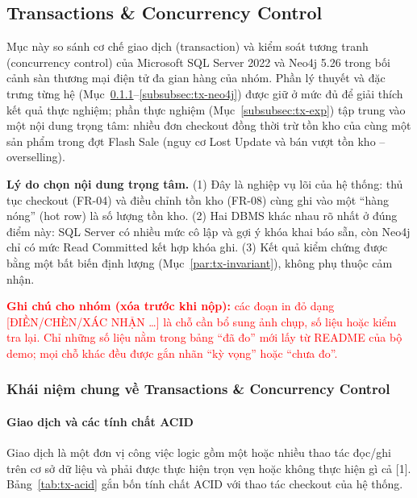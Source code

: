 \subsection{Transactions \& Concurrency Control}
\label{subsec:tx-cc}

Mục này so sánh cơ chế giao dịch (transaction) và kiểm soát tương tranh (concurrency control) của Microsoft SQL Server 2022 và Neo4j 5.26 trong bối cảnh sàn thương mại điện tử đa gian hàng của nhóm. Phần lý thuyết và đặc trưng từng hệ (Mục~\ref{subsubsec:tx-concepts}--\ref{subsubsec:tx-neo4j}) được giữ ở mức đủ để giải thích kết quả thực nghiệm; phần thực nghiệm (Mục~\ref{subsubsec:tx-exp}) tập trung vào một nội dung trọng tâm: nhiều đơn checkout đồng thời trừ tồn kho của cùng một sản phẩm trong đợt Flash Sale (nguy cơ Lost Update và bán vượt tồn kho -- overselling).

\textbf{Lý do chọn nội dung trọng tâm.} (1) Đây là nghiệp vụ lõi của hệ thống: thủ tục checkout (FR-04) và điều chỉnh tồn kho (FR-08) cùng ghi vào một ``hàng nóng'' (hot row) là số lượng tồn kho. (2) Hai DBMS khác nhau rõ nhất ở đúng điểm này: SQL Server có nhiều mức cô lập và gợi ý khóa khai báo sẵn, còn Neo4j chỉ có mức Read Committed kết hợp khóa ghi. (3) Kết quả kiểm chứng được bằng một bất biến định lượng (Mục~\ref{par:tx-invariant}), không phụ thuộc cảm nhận.

\noindent\textcolor{red}{\textbf{Ghi chú cho nhóm (xóa trước khi nộp):} các đoạn in đỏ dạng [ĐIỀN/CHÈN/XÁC NHẬN \ldots] là chỗ cần bổ sung ảnh chụp, số liệu hoặc kiểm tra lại. Chỉ những số liệu nằm trong bảng ``đã đo'' mới lấy từ README của bộ demo; mọi chỗ khác đều được gắn nhãn ``kỳ vọng'' hoặc ``chưa đo''.}

\subsubsection{Khái niệm chung về Transactions \& Concurrency Control}
\label{subsubsec:tx-concepts}

\paragraph{Giao dịch và các tính chất ACID}\mbox{}

Giao dịch là một đơn vị công việc logic gồm một hoặc nhiều thao tác đọc/ghi trên cơ sở dữ liệu và phải được thực hiện trọn vẹn hoặc không thực hiện gì cả [1]. Bảng~\ref{tab:tx-acid} gắn bốn tính chất ACID với thao tác checkout của hệ thống.

